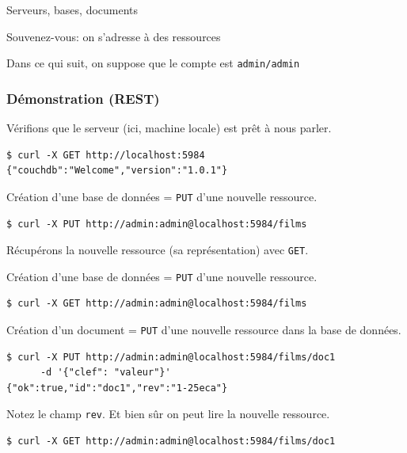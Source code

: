 \begin{frame}{Serveurs, bases, documents}

Souvenez-vous: on s'adresse à des \alert{ressources}
\vfill


\vfill

Dans ce qui suit, on suppose que le compte est \texttt{admin/admin}
\end{frame}

\begin{frame}[fragile]
\frametitle{Démonstration (REST)}

Vérifions que le serveur (ici, machine locale) est prêt à nous parler.

\begin{verbatim}
$ curl -X GET http://localhost:5984
{"couchdb":"Welcome","version":"1.0.1"}
\end{verbatim}

\vfill
Création d'une base de données = \texttt{PUT} d'une nouvelle ressource. 

\begin{verbatim}
$ curl -X PUT http://admin:admin@localhost:5984/films
\end{verbatim}

\vfill 

Récupérons la nouvelle ressource (sa représentation) avec \texttt{GET}.

Création d'une base de données = \texttt{PUT} d'une nouvelle ressource. 

\begin{verbatim}
$ curl -X GET http://admin:admin@localhost:5984/films
\end{verbatim}

\vfill

Création d'un document = \texttt{PUT} d'une nouvelle ressource dans la base de données. 

\begin{verbatim}
$ curl -X PUT http://admin:admin@localhost:5984/films/doc1 
      -d '{"clef": "valeur"}'
{"ok":true,"id":"doc1","rev":"1-25eca"}
\end{verbatim}
\vfill

Notez le champ \texttt{rev}. Et bien sûr on peut lire la nouvelle ressource.

\begin{verbatim}
$ curl -X GET http://admin:admin@localhost:5984/films/doc1
\end{verbatim}

\end{frame}


